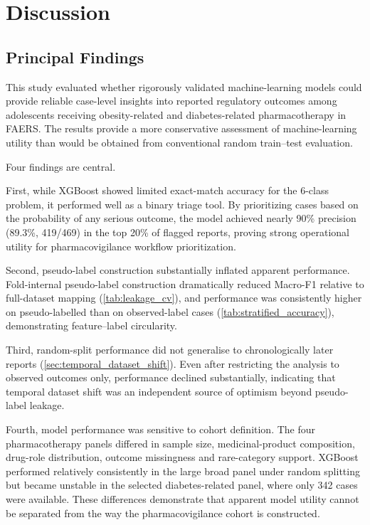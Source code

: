 \documentclass[10pt]{article}
\begin{document}
\section{Discussion}
\subsection{Principal Findings}
This study evaluated whether rigorously validated machine-learning models could provide reliable case-level insights into reported regulatory outcomes among adolescents receiving obesity-related and diabetes-related pharmacotherapy in FAERS. The results provide a more conservative assessment of machine-learning utility than would be obtained from conventional random train--test evaluation.

Four findings are central.

First, while XGBoost showed limited exact-match accuracy for the 6-class problem, it performed well as a binary triage tool. By prioritizing cases based on the probability of any serious outcome, the model achieved nearly 90\% precision (89.3\%, 419/469) in the top 20\% of flagged reports, proving strong operational utility for pharmacovigilance workflow prioritization.

Second, pseudo-label construction substantially inflated apparent performance. Fold-internal pseudo-label construction dramatically reduced Macro-F1 relative to full-dataset mapping (\cref{tab:leakage_cv}), and performance was consistently higher on pseudo-labelled than on observed-label cases (\cref{tab:stratified_accuracy}), demonstrating feature--label circularity.

Third, random-split performance did not generalise to chronologically later reports (\cref{sec:temporal_dataset_shift}). Even after restricting the analysis to observed outcomes only, performance declined substantially, indicating that temporal dataset shift was an independent source of optimism beyond pseudo-label leakage.

Fourth, model performance was sensitive to cohort definition. The four pharmacotherapy panels differed in sample size, medicinal-product composition, drug-role distribution, outcome missingness and rare-category support. XGBoost performed relatively consistently in the large broad panel under random splitting but became unstable in the selected diabetes-related panel, where only 342 cases were available. These differences demonstrate that apparent model utility cannot be separated from the way the pharmacovigilance cohort is constructed.
\end{document}
